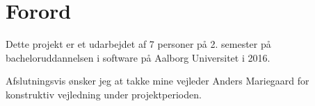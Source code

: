 \section{Forord}\label{Forord}

Dette projekt er et udarbejdet af 7 personer på 2. semester på bacheloruddannelsen i software på Aalborg Universitet i 2016.

\vspace{5mm}

Afslutningsvis ønsker jeg at takke mine vejleder Anders Mariegaard for konstruktiv vejledning under projektperioden.